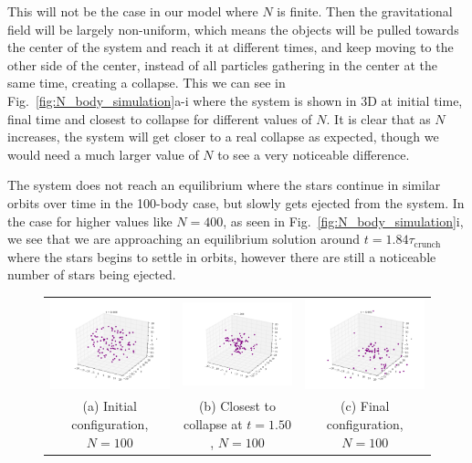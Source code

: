 \documentclass{article}
\begin{document}
\begin{multicols}{2}
This will not be the case in our model where $N$ is finite. Then the gravitational field will be largely non-uniform, which means the objects will be pulled towards the center of the system and reach it at different times, and keep moving to the other side of the center, instead of all particles gathering in the center at the same time, creating a collapse. This we can see in Fig.~\ref{fig:N_body_simulation}a-i where the system is shown in 3D at initial time, final time and closest to collapse for different values of $N$. It is clear that as $N$ increases, the system will get closer to a real collapse as expected, though we would need a much larger value of $N$ to see a very noticeable difference.

The system does not reach an equilibrium where the stars continue in similar orbits over time in the 100-body case, but slowly gets ejected from the system. In the case for higher values like $N = 400$, as seen in Fig.~\ref{fig:N_body_simulation}i, we see that we are approaching an equilibrium solution around $t = 1.84\tau_{\mathrm{crunch}}$ where the stars begins to settle in orbits, however there are still a noticeable number of stars being ejected. 

\begin{figure}
\begin{center}
\begin{tabular}{ccc}
  	\includegraphics[width=60mm]{Images/Image_100_0000.png}
	& \includegraphics[width=60mm]{Images/Image_100_1500.png}
	& \includegraphics[width=60mm]{Images/Image_100_4995.png} \\
	(a) Initial configuration, $N = 100$				& (b) Closest to collapse at $t = 1.50$, $N = 100$	 	& (c) Final configuration, $N = 100$	 \\[6pt]
	

\end{tabular}
\end{center}
\end{figure}
\end{multicols}
\end{document}

